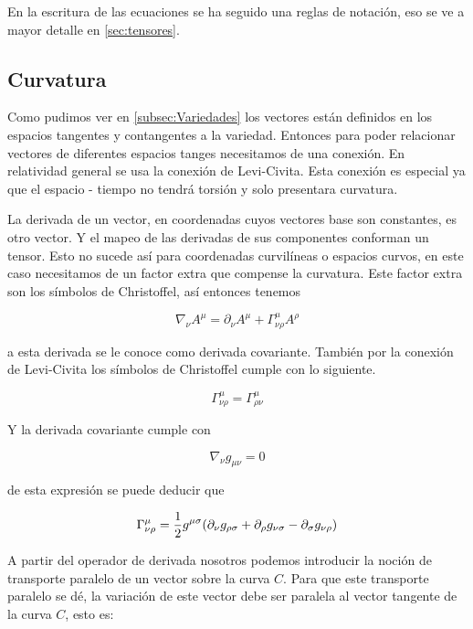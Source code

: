 \documentclass[../Main.tex]{subfiles}
\begin{document}
En la escritura de las ecuaciones se ha seguido una reglas de notación, eso se ve a mayor detalle en \ref{sec:tensores}.

\subsection{Curvatura}
Como pudimos ver en \ref{subsec:Variedades} los vectores están definidos en los espacios tangentes y contangentes a la variedad. Entonces para poder relacionar vectores de diferentes espacios tanges necesitamos de una conexión. En relatividad general se usa la conexión de Levi-Civita. Esta conexión es especial ya que el espacio - tiempo no tendrá torsión y solo presentara curvatura.

La derivada de un vector, en coordenadas cuyos vectores base son constantes, es otro vector. Y el mapeo de las derivadas de sus componentes conforman un tensor. Esto no sucede así para coordenadas curvilíneas o espacios curvos, en este caso necesitamos de un factor extra que compense la curvatura. Este factor extra son los símbolos de Christoffel, así entonces tenemos

\begin{equation}
    \nabla_{\nu}{A}^{\mu} = \partial_{\nu}{A}^{\mu}+\Gamma^{\mu}_{\nu\rho}A^{\rho}
\end{equation}

a esta derivada se le conoce como derivada covariante. También por la conexión de Levi-Civita los símbolos de Christoffel cumple con lo siguiente.

\begin{equation}
    \Gamma^{\mu}_{\nu\rho} = \Gamma^{\mu}_{\rho\nu}
\end{equation}

Y la derivada covariante cumple con

\begin{equation}
    \nabla_{\nu}{g_{\mu\nu}} = 0
\end{equation}

de esta expresión se puede deducir que

\begin{equation}
    \Gamma^{\mu}_{\nu\rho} = \dfrac{1}{2}g^{\mu\sigma}\qty(\partial_{\nu}{g_{\rho\sigma}}+\partial_{\rho}{g_{\nu\sigma}}-\partial_{\sigma}{g_{\nu\rho}})
\end{equation}

A partir del operador de derivada nosotros podemos introducir la noción de transporte paralelo de un vector sobre la curva $C$. Para que este transporte paralelo se dé, la variación de este vector debe ser paralela al vector tangente de la curva $C$, esto es:
\end{document}
